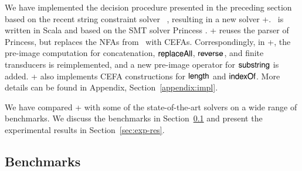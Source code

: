 
We have implemented the decision procedure presented in the preceding section based on the recent string constraint solver \ostrich~\cite{CHL+19}, resulting in a new solver \ostrich+. \ostrich\ is  written in Scala and based on the SMT solver Princess \cite{princess08}. \ostrich+ reuses the parser of Princess, but replaces the NFAs from \ostrich\ with CEFAs. Correspondingly, in \ostrich+, the pre-image  computation for concatenation, $\mathsf{replaceAll}$, $\mathsf{reverse}$, and finite transducers is reimplemented, and a new pre-image operator for $\mathsf{substring}$ is added. \ostrich+ also implements CEFA constructions for $\mathsf{length}$ and $\mathsf{indexOf}$.  More details can be found in Appendix, Section~\ref{appendix:impl}.

We have compared {\ostrich}+ with some of the state-of-the-art solvers on a wide range of benchmarks.  
We  discuss the benchmarks in Section~\ref{sec:bench} and %
present the experimental results in Section~\ref{sec:exp-res}.



\subsection{Benchmarks}\label{sec:bench}
 

